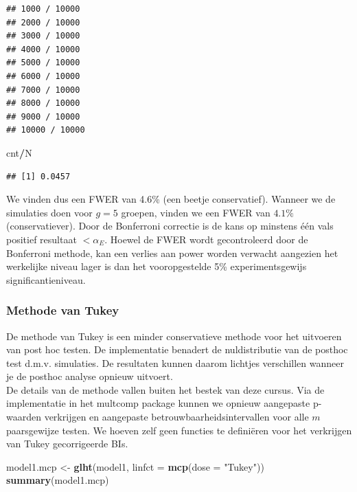 \documentclass[
  12pt,dutch]{book}
\newenvironment{Shaded}{\begin{snugshade}}{\end{snugshade}}
\newcommand{\AttributeTok}[1]{\textcolor[rgb]{0.13,0.29,0.53}{#1}}
\newcommand{\FunctionTok}[1]{\textcolor[rgb]{0.13,0.29,0.53}{\textbf{#1}}}
\newcommand{\NormalTok}[1]{#1}
\newcommand{\OtherTok}[1]{\textcolor[rgb]{0.56,0.35,0.01}{#1}}
\newcommand{\SpecialCharTok}[1]{\textcolor[rgb]{0.81,0.36,0.00}{\textbf{#1}}}
\newcommand{\StringTok}[1]{\textcolor[rgb]{0.31,0.60,0.02}{#1}}
\theoremstyle{definition}
\theoremstyle{definition}
\theoremstyle{definition}
\theoremstyle{definition}
\theoremstyle{remark}
\begin{document}
\begin{verbatim}
## 1000 / 10000 
## 2000 / 10000 
## 3000 / 10000 
## 4000 / 10000 
## 5000 / 10000 
## 6000 / 10000 
## 7000 / 10000 
## 8000 / 10000 
## 9000 / 10000 
## 10000 / 10000
\end{verbatim}

\begin{Shaded}
\begin{Highlighting}[]
\NormalTok{cnt}\SpecialCharTok{/}\NormalTok{N}
\end{Highlighting}
\end{Shaded}

\begin{verbatim}
## [1] 0.0457
\end{verbatim}

We vinden dus een FWER van 4.6\% (een beetje conservatief). Wanneer we de simulaties doen voor \(g=5\) groepen, vinden we een FWER van \(4.1\%\) (conservatiever). Door de Bonferroni correctie is de kans op minstens één vals positief resultaat \(< \alpha_E\). Hoewel de FWER wordt gecontroleerd door de Bonferroni methode, kan een verlies aan power worden verwacht aangezien het werkelijke niveau lager is dan het vooropgestelde 5\% experimentsgewijs significantieniveau.

\subsubsection{Methode van Tukey}\label{methode-van-tukey}

De methode van Tukey is een minder conservatieve methode voor het uitvoeren van post hoc testen.
De implementatie benadert de nuldistributie van de posthoc test d.m.v. simulaties.
De resultaten kunnen daarom lichtjes verschillen wanneer je de posthoc analyse opnieuw uitvoert.\\
De details van de methode vallen buiten het bestek van deze cursus.
Via de implementatie in het multcomp package kunnen we opnieuw aangepaste p-waarden verkrijgen en aangepaste betrouwbaarheidsintervallen voor alle \(m\) paarsgewijze testen.
We hoeven zelf geen functies te definiëren voor het verkrijgen van Tukey gecorrigeerde BIs.

\begin{Shaded}
\begin{Highlighting}[]
\NormalTok{model1.mcp }\OtherTok{\textless{}{-}} \FunctionTok{glht}\NormalTok{(model1, }\AttributeTok{linfct =} \FunctionTok{mcp}\NormalTok{(}\AttributeTok{dose =} \StringTok{"Tukey"}\NormalTok{))}
\FunctionTok{summary}\NormalTok{(model1.mcp)}
\end{Highlighting}
\end{Shaded}
\end{document}
